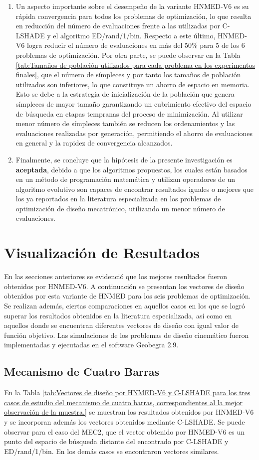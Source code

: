 \begin{enumerate}
  \item Un aspecto importante sobre el desempeño de la variante HNMED-V6 es su rápida convergencia para todos los problemas de optimización, lo que resulta en reducción del número de evaluaciones frente a las utilizadas por C-LSHADE y el algoritmo ED/rand/1/bin. Respecto a este último, HNMED-V6 logra reducir el número de evaluaciones en más del 50\% para 5 de los 6 problemas de optimización. Por otra parte, se puede observar en la Tabla \ref{tab:Tamaños de población utilizados para cada problema en los experimentos finales}, que el número de símpleces y por tanto los tamaños de población utilizados son inferiores, lo que constituye un ahorro de espacio en memoria. Esto se debe a la estrategia de inicialización de la población que genera símpleces de mayor tamaño  garantizando un cubrimiento efectivo del espacio de búsqueda en etapas tempranas del proceso de minimización. Al utilizar menor número de símpleces también se reducen los ordenamientos y las evaluaciones realizadas por generación, permitiendo el ahorro de evaluaciones en general y la rapidez de convergencia alcanzados.

\item Finalmente, se concluye que la hipótesis de la presente investigación es \textbf{aceptada}, debido a que los algoritmos propuestos, los cuales están basados en un método de programación matemática y utilizan operadores de un algoritmo evolutivo son capaces de encontrar resultados iguales o mejores que los ya reportados en la literatura especializada en los problemas de optimización de diseño mecatrónico, utilizando un menor número de evaluaciones.
\end{enumerate}

\section{Visualización de Resultados}
En las secciones anteriores se evidenció que los mejores resultados fueron obtenidos por HNMED-V6. A continuación se presentan los vectores de diseño obtenidos por esta variante de HNMED para los seis problemas de optimización. Se realizan además, ciertas comparaciones en aquellos casos en los que se logró superar los resultados obtenidos en la literatura especializada, así como en aquellos donde se encuentran diferentes vectores de diseño con igual valor de función objetivo. Las simulaciones de los problemas de diseño cinemático fueron implementadas y ejecutadas en el software Geobegra 2.9.
\subsection{Mecanismo de Cuatro Barras}
En la Tabla \ref{tab:Vectores de diseño por HNMED-V6 y C-LSHADE para los tres casos de estudio del mecanismo de cuatro barras, correspondientes al la mejor observación de la muestra.} se muestran los resultados obtenidos por HNMED-V6 y se incorporan además los vectores obtenidos mediante C-LSHADE. Se puede observar para el caso del MEC2, que el vector obtenido por HNMED-V6 es un punto del espacio de búsqueda distante del encontrado por C-LSHADE y ED/rand/1/bin. En los demás casos se encontraron vectores similares.  

